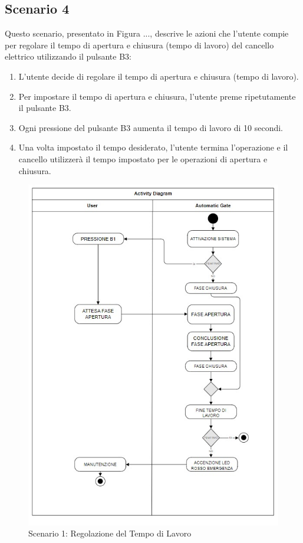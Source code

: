 \documentclass[12pt]{article}
\begin{document}
\newpage
\subsection{Scenario 4}
Questo scenario, presentato in Figura ..., descrive le azioni che l’utente compie per regolare il tempo di apertura e chiusura (tempo di lavoro) del cancello elettrico utilizzando il pulsante B3:

\begin{enumerate}
    \item L’utente decide di regolare il tempo di apertura e chiusura (tempo di lavoro).
    \item Per impostare il tempo di apertura e chiusura, l’utente preme ripetutamente il pulsante B3.
    \item Ogni pressione del pulsante B3 aumenta il tempo di lavoro di 10 secondi.
    \item Una volta impostato il tempo desiderato, l’utente termina l’operazione e il cancello utilizzerà il tempo impostato per le operazioni di apertura e chiusura.
\end{enumerate}

\begin{figure}[h]
    \centering
    \includegraphics[width = 0.7 \textwidth]{Scenario_4.jpg}
    \caption{Scenario 1: Regolazione del Tempo di Lavoro}
    
\end{figure}
\end{document}
